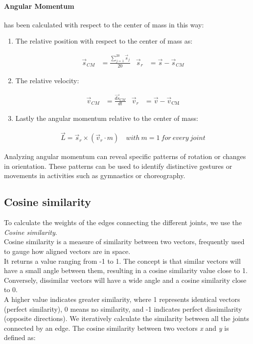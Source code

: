 \paragraph{Angular Momentum} has been calculated with respect to the center of mass in this way:
\begin{enumerate}
  \item The relative position with respect to the center of mass as: 
  \begin{table}[h]
    \begin{align}
        \vec{s}_{CM} &= \frac{{\sum_{j=1}^{20} \vec{s}_{j}}}{{20}} &
        \vec{s}_{r} &= \vec{s} - \vec{s}_{CM} \label{eq:rel_pos}
    \end{align}
  \end{table}
  \item The relative velocity:
  \begin{table}[H]
    \begin{align}
        \vec{v}_{CM} &= \frac{\vec{ds}_{CM}}{dt} &
        \vec{v}_{r} &= \vec{v} - \vec{v}_{\text{CM}} \label{eq:rel_vel}
    \end{align}
  \end{table}
  \item Lastly the angular momentum relative to the center of mass:
  \begin{table}[H]
    \begin{align}
      \vec{L} = \vec{s}_{r} \times (\vec{v}_{r} \cdot m) \quad with \ m = 1 \ for \ every \ joint \label{eq:ang_mom}
    \end{align}
  \end{table}
\end{enumerate}

Analyzing angular momentum can reveal specific patterns of rotation or changes in orientation.
These patterns can be used to identify distinctive gestures or movements in activities such as gymnastics or choreography.

\subsection{Cosine similarity} 
    
To calculate the weights of the edges connecting the different joints, we use the \textit{Cosine similarity}. \\ 
Cosine similarity is a measure of similarity between two vectors, frequently used to gauge how aligned vectors are in space. \\ 
It returns a value ranging from -1 to 1. 
The concept is that similar vectors will have a small angle between them, resulting in a cosine similarity value close to 1. \\ 
Conversely, dissimilar vectors will have a wide angle and a cosine similarity close to 0.\\ 
A higher value indicates greater similarity, where 1 represents identical vectors (perfect similarity), 0 means no similarity, and -1 indicates perfect dissimilarity (opposite directions). 
We iteratively calculate the similarity between all the joints connected by an edge. 
The cosine similarity between two vectors \textit{x} and \textit{y} is defined as: 


